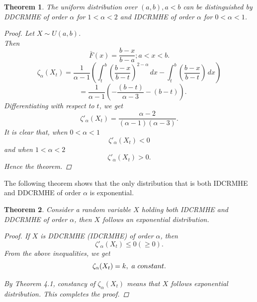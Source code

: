 \documentclass[11pt,reqno]{amsart}
\theoremstyle{tight}
\newtheorem{theorem}{Theorem}[section]
\newtheorem{corollary}{Corollary}[section]
\begin{document}
\begin{theorem}
    The uniform distribution over $(a,b),a<b$ can be distinguished by DDCRMHE of order $\alpha$ for $1<\alpha<2$ and IDCRMHE of order $\alpha$ for $0<\alpha<1$.
    \begin{proof}
        Let $X \sim U(a,b)$.\\ Then
        \[
        \bar{F}(x)=\frac{b-x}{b-a};a<x<b.
        \]
      \[
      \zeta_{\alpha}(X_t)=\frac{1}{\alpha-1}\left( {\int_t^b} \left(\frac{b-x}{b-t} \right)^{2-\alpha}\,dx - {\int_t^b} \left(\frac{b-x}{b-t}\right) \,dx \right)
      \]
      \[
   \quad   =\frac{1}{\alpha-1}\left(-\frac{(b-t)}{\alpha-3}-(b-t)\right).
      \]
      Differentiating with respect to $t$, we get
       \[
       \zeta'_{\alpha}(X_t)=\frac{\alpha-2}{(\alpha-1)(\alpha-3)}.
       \]
       It is clear that, when $0<\alpha<1$ \[\zeta'_{\alpha}(X_t)<0\]
       and when $ 1<\alpha<2$ \[\zeta'_{\alpha}(X_t)>0.
       \]
       Hence the theorem.
        \end{proof}
\end{theorem}
\begin{flushleft}
    The following theorem shows that the only distribution that is both IDCRMHE and DDCRMHE of order $\alpha$ is exponential.
\end{flushleft}
       \begin{theorem}
        Consider a random variable $X$ holding both IDCRMHE and DDCRMHE of order $\alpha$, then $X$ follows an exponential distribution.
        \begin{proof}
            If $X$ is DDCRMHE (IDCRMHE) of order $\alpha$, then  \[
             \zeta'_{\alpha}(X_t)\leq0(\geq0).
            \]
            From the above  inequalities, we get \[
            \zeta_{\alpha}(X_t)=k, \\\ a \\\ constant.
            \]

            By Theorem 4.1, constancy of $\zeta_{\alpha}(X_t)$ means that $X$ follows exponential distribution. This completes the proof.
        \end{proof}

       \end{theorem}

\end{document}
